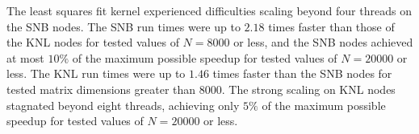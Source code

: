 The least squares fit kernel experienced difficulties scaling beyond
  four threads on the SNB nodes.
The SNB run times were up to $2.18$ times faster than those of the
  KNL nodes for tested values of $N=8000$ or less, and the SNB nodes achieved at
  most $10\%$ of the maximum possible speedup for tested values of $N=20000$ or
  less.
The KNL run times were up to $1.46$ times faster than the SNB nodes for tested
  matrix dimensions greater than $8000$.
The strong scaling on KNL nodes stagnated beyond eight threads, achieving
  only $5\%$ of the maximum possible speedup for tested values of $N=20000$ or
  less.

